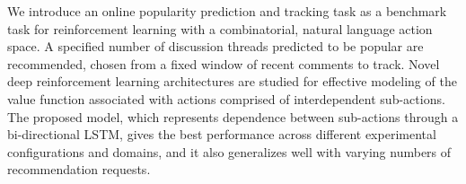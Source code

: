 We introduce an online popularity prediction and tracking task as a benchmark task for reinforcement learning with a combinatorial, natural language action space. A specified number of discussion threads predicted to be popular are recommended, chosen from a fixed window of recent comments to track. Novel deep reinforcement learning architectures are studied for effective modeling of the value function associated with actions comprised of interdependent sub-actions. The proposed model, which represents dependence between sub-actions through a bi-directional LSTM, gives the best performance across different experimental configurations and domains, and it also generalizes well with varying numbers of recommendation requests.
